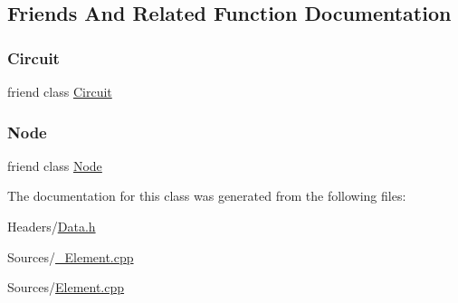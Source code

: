 \subsection{Friends And Related Function Documentation}
\mbox{\label{class_element_a120b136c2c9bc1938e0cd2cca80d91e4}} 
\subsubsection{\texorpdfstring{Circuit}{Circuit}}
{\footnotesize\ttfamily friend class \hyperlink{class_circuit}{Circuit}\hspace{0.3cm}{\ttfamily [friend]}}

\mbox{\label{class_element_a6db9d28bd448a131448276ee03de1e6d}} 
\subsubsection{\texorpdfstring{Node}{Node}}
{\footnotesize\ttfamily friend class \hyperlink{class_node}{Node}\hspace{0.3cm}{\ttfamily [friend]}}



The documentation for this class was generated from the following files\+:\begin{DoxyCompactItemize}
\item 
Headers/\hyperlink{_data_8h}{Data.\+h}\item 
Sources/\hyperlink{___element_8cpp}{\+\_\+\+Element.\+cpp}\item 
Sources/\hyperlink{_element_8cpp}{Element.\+cpp}\end{DoxyCompactItemize}
